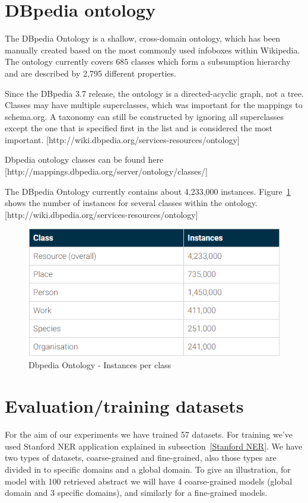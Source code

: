 \documentclass[thesis=M,english]{FITthesis}[2018/05/30]
\begin{document}
\section{DBpedia ontology}
The DBpedia Ontology is a shallow, cross-domain ontology, which has been manually created based on the most commonly used infoboxes within Wikipedia. The ontology currently covers 685 classes which form a subsumption hierarchy and are described by 2,795 different properties.

Since the DBpedia 3.7 release, the ontology is a directed-acyclic graph, not a tree. Classes may have multiple superclasses, which was important for the mappings to schema.org. A taxonomy can still be constructed by ignoring all superclasses except the one that is specified first in the list and is considered the most important. [http://wiki.dbpedia.org/services-resources/ontology]

Dbpedia ontology classes can be found here [http://mappings.dbpedia.org/server/ontology/classes/]

The DBpedia Ontology currently contains about 4,233,000 instances. Figure~\ref{fig:Dbpedia-ontology} shows the number of instances for several classes within the ontology. [http://wiki.dbpedia.org/services-resources/ontology]

	\begin{figure}[H]\centering
		\includegraphics[width=\textwidth]{Dbpedia-ontology}
		\caption{Dbpedia Ontology - Instances per class}\label{fig:Dbpedia-ontology}
	\end{figure}

\section{Evaluation/training datasets}
For the aim of our experiments we have trained 57 datasets. For training we've used Stanford NER application explained in subsection~\ref{Stanford NER}. We have two types of datasets, coarse-grained and fine-grained, also those types are divided in to specific domains and a global domain. To give an illustration, for model with 100 retrieved abstract we will have 4 coarse-grained models (global domain and 3 specific domains), and similarly for a fine-grained models.
\end{document}
